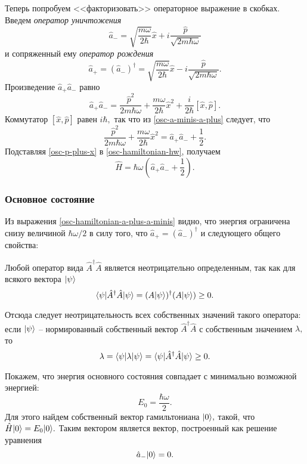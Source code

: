 \documentclass[b5paper]{book}
\DeclarePairedDelimiter\bra{\langle}{\rvert}
\DeclarePairedDelimiter\ket{\lvert}{\rangle}
\begin{document}
Теперь попробуем <<факторизовать>> операторное выражение в скобках. Введем \textit{оператор уничтожения}
$$\hat a_{-} = \sqrt{\frac{m\omega}{2\hbar}} \hat x + i \frac {\hat p} {\sqrt{2 m \hbar \omega}}$$
и сопряженный ему \textit{оператор рождения}
$$\hat a_{+} = (\hat a_{-})^\dagger =  \sqrt{\frac{m\omega}{2\hbar}} \hat x - i \frac {\hat p} {\sqrt{2 m \hbar \omega}}.$$
Произведение $\hat a_{+} \hat a_{-}$ равно
\begin{equation}\label{osc-a-minis-a-plus}
 \hat a_{+} \hat a_{-} = \frac {\hat p^2} {2 m \hbar \omega} + \frac {m\omega} {2\hbar} \hat x^2 +
\frac {i} {2\hbar} [\hat x, \hat p].
\end{equation}
Коммутатор $[\hat x, \hat p]$ равен $i \hbar,$ так что из \eqref{osc-a-minis-a-plus} следует, что
\begin{equation}\label{osc-p-plus-x}
\frac {\hat p^2} {2 m \hbar \omega} + \frac {m\omega} {2\hbar} \hat x^2 = \hat a_{+} \hat a_{-} +
\frac {1} {2}.
\end{equation}
Подставляя \eqref{osc-p-plus-x} в \eqref{osc-hamiltonian-hw}, получаем
\begin{equation}\label{osc-hamiltonian-a-plus-a-minis}
 \hat H = \hbar \omega \left(\hat a_{+} \hat a_{-} + \frac {1} {2}\right).
\end{equation}

\subsubsection*{Основное состояние}

Из выражения \eqref{osc-hamiltonian-a-plus-a-minis} видно, что энергия ограничена снизу величиной
$\hbar \omega / 2$
в силу того, что $\hat a_{+} = (\hat a_{-})^\dagger$ и следующего общего свойства:

\begin{mathadd}{}
    Любой оператор вида $\hat A^{\dagger} \hat A$ является неотрицательно определенным, так как
    для всякого вектора $\ket{\psi}$
    $$\bra{\psi} \hat A^{\dagger} \hat A \ket{\psi} = (A \ket{\psi})^{\dagger} (A \ket{\psi}) \geq 0.$$

    Отсюда следует неотрицательность всех собственных значений такого оператора: если $\ket{\psi}$ -- нормированный собственный вектор $\hat A^{\dagger} \hat A$ с собственным значением $\lambda,$ то
    $$\lambda = \bra{\psi} \lambda \ket{\psi} = \bra{\psi} \hat A^{\dagger} \hat A \ket{\psi} \geq 0.$$
\end{mathadd}

Покажем, что энергия основного состояния совпадает с минимально возможной энергией:
$$E_0 = \frac {\hbar \omega} {2}.$$ Для этого найдем собственный вектор гамильтониана $\ket{0},$
такой, что $\hat H \ket{0} = E_0 \ket{0}.$ Таким вектором является вектор, построенный как решение
уравнения
$$\hat a_{-} \ket {0} = 0.$$
\end{document}
